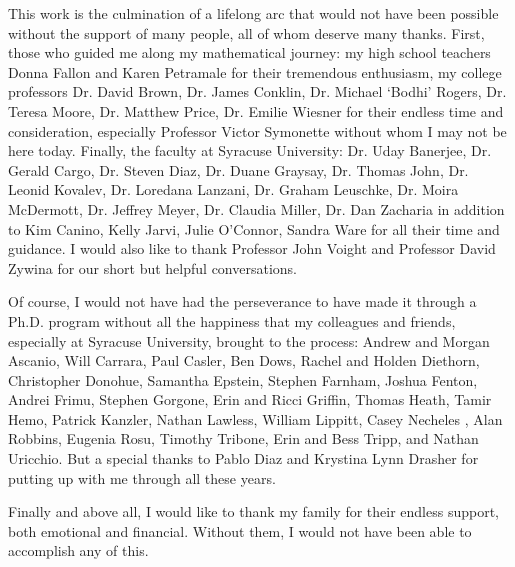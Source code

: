 \newpage
\acknowledgements

\vspace{-0.25\baselineskip}
This work is the culmination of a lifelong arc that would not have been possible without the support of many people, all of whom deserve many thanks. First, those who guided me along my mathematical journey: my high school teachers Donna Fallon and Karen Petramale for their tremendous enthusiasm, my college professors Dr. David Brown, Dr. James Conklin, Dr. Michael `Bodhi' Rogers, Dr. Teresa Moore, Dr. Matthew Price, Dr. Emilie Wiesner for their endless time and consideration, especially Professor Victor Symonette without whom I may not be here today. Finally, the faculty at Syracuse University: Dr. Uday Banerjee, Dr. Gerald Cargo, Dr. Steven Diaz, Dr. Duane Graysay, Dr. Thomas John, Dr. Leonid Kovalev, Dr. Loredana Lanzani, Dr. Graham Leuschke, Dr. Moira McDermott, Dr. Jeffrey Meyer, Dr. Claudia Miller, Dr. Dan Zacharia in addition to Kim Canino, Kelly Jarvi, Julie O'Connor, Sandra Ware for all their time and guidance. I would also like to thank Professor John Voight and Professor David Zywina for our short but helpful conversations. 

\vspace{-0.25\baselineskip}
Of course, I would not have had the perseverance to have made it through a Ph.D. program without all the happiness that my colleagues and friends, especially at Syracuse University, brought to the process: Andrew and Morgan Ascanio, Will Carrara, Paul Casler, Ben Dows, Rachel and Holden Diethorn, Christopher Donohue, Samantha Epstein, Stephen Farnham, Joshua Fenton, Andrei Frimu, Stephen Gorgone, Erin and Ricci Griffin, Thomas Heath, Tamir Hemo, Patrick Kanzler, Nathan Lawless, William Lippitt, Casey Necheles , Alan Robbins, Eugenia Rosu, Timothy Tribone, Erin and Bess Tripp, and Nathan Uricchio. But a special thanks to Pablo Diaz and Krystina Lynn Drasher for putting up with me through all these years. 

\vspace{-0.25\baselineskip}
Finally and above all, I would like to thank my family for their endless support, both emotional and financial. Without them, I would not have been able to accomplish any of this. 